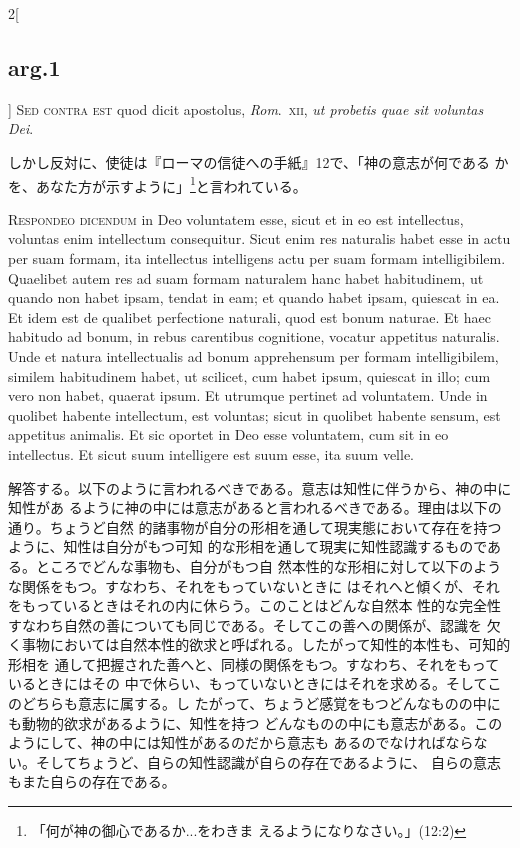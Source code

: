 \documentclass[paper=a4paper,fontsize=10pt,jafontsize=9pt,titlepage]{jlreq}
\begin{document}
\begin{paracol}{2}[\subsection{arg.1}]
{\scshape  Sed contra est} quod dicit apostolus,
{\itshape Rom}.~{\scshape xii}, {\itshape ut probetis quae sit voluntas Dei}.

\switchcolumn

しかし反対に、使徒は『ローマの信徒への手紙』12で、「神の意志が何である
 かを、あなた方が示すように」\footnote{「何が神の御心であるか...をわきま
 えるようになりなさい。」(12:2)}と言われている。



{\scshape Respondeo dicendum} in Deo voluntatem esse, sicut et in eo est
intellectus, voluntas enim intellectum consequitur. Sicut enim res naturalis
habet esse in actu per suam formam, ita intellectus intelligens actu per suam
formam intelligibilem. Quaelibet autem res ad suam formam naturalem hanc habet
habitudinem, ut quando non habet ipsam, tendat in eam; et quando habet ipsam,
quiescat in ea. Et idem est de qualibet perfectione naturali, quod est bonum
naturae. Et haec habitudo ad bonum, in rebus carentibus cognitione, vocatur
appetitus naturalis. Unde et natura intellectualis ad bonum apprehensum per
formam intelligibilem, similem habitudinem habet, ut scilicet, cum habet ipsum,
quiescat in illo; cum vero non habet, quaerat ipsum. Et utrumque pertinet ad
voluntatem. Unde in quolibet habente intellectum, est voluntas; sicut in
quolibet habente sensum, est appetitus animalis. Et sic oportet in Deo esse
voluntatem, cum sit in eo intellectus. Et sicut suum intelligere est suum esse,
ita suum velle.

\switchcolumn

解答する。以下のように言われるべきである。意志は知性に伴うから、神の中に知性があ
るように神の中には意志があると言われるべきである。理由は以下の通り。ちょうど自然
的諸事物が自分の形相を通して現実態において存在を持つように、知性は自分がもつ可知
的な形相を通して現実に知性認識するものである。ところでどんな事物も、自分がもつ自
然本性的な形相に対して以下のような関係をもつ。すなわち、それをもっていないときに
はそれへと傾くが、それをもっているときはそれの内に休らう。このことはどんな自然本
性的な完全性すなわち自然の善についても同じである。そしてこの善への関係が、認識を
欠く事物においては自然本性的欲求と呼ばれる。したがって知性的本性も、可知的形相を
通して把握された善へと、同様の関係をもつ。すなわち、それをもっているときにはその
中で休らい、もっていないときにはそれを求める。そしてこのどちらも意志に属する。し
たがって、ちょうど感覚をもつどんなものの中にも動物的欲求があるように、知性を持つ
どんなものの中にも意志がある。このようにして、神の中には知性があるのだから意志も
あるのでなければならない。そしてちょうど、自らの知性認識が自らの存在であるように、
自らの意志もまた自らの存在である。


\end{paracol}
\end{document}
